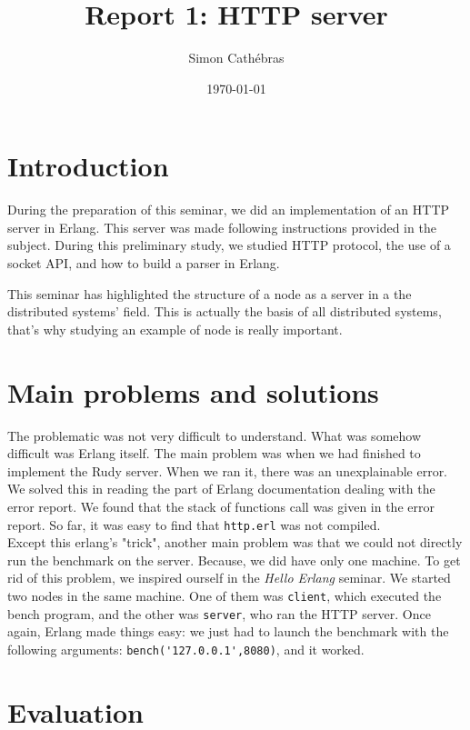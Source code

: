 \documentclass[a4paper, 11pt]{article}
\title{Report 1: HTTP server}
\author{Simon Cathébras}
\date{\today{}}
\begin{document}
\maketitle

\section{Introduction}

During the preparation of this seminar, we did an implementation of an HTTP server in Erlang. This server was made following instructions provided in the subject.
During this preliminary study, we studied HTTP protocol, the use of a socket API, and how to build a parser in Erlang.

This seminar has highlighted the structure of a node as a server in a the distributed systems' field.
This is actually the basis of all distributed systems, that's why studying an example of node is really important. 


\section{Main problems and solutions}


  
  The problematic was not very difficult to understand. What was somehow difficult was Erlang itself. 
  The main problem was when we had finished to implement the Rudy server. When we ran it, there was an unexplainable error. We solved this in reading the part of Erlang documentation dealing with the error report. We found that the stack of functions call was given in the error report. So far, it was easy to find that \lstinline!http.erl! was not compiled.\\
  
Except this erlang's "trick", another main problem was that we could not directly run the benchmark on the server. Because, we did have only one machine. To get rid of this problem, we inspired ourself in the \textit{Hello Erlang} seminar. We started two nodes in the same machine. One of them was \lstinline!client!, which executed the bench program, and the other was \lstinline!server!, who ran the HTTP server. Once again, Erlang made things easy: we just had to launch the benchmark with the following arguments: \lstinline!bench('127.0.0.1',8080)!, and it worked. \\


\section{Evaluation}
\end{document}
